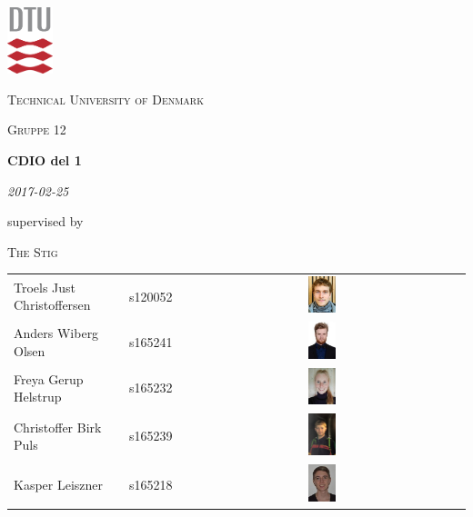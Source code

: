 \begin{titlepage}

\centering
\includegraphics[width=0.1\textwidth]{images/dtu.pdf}\par\vspace{1cm}

{\scshape\LARGE Technical University of Denmark \par}
	\vspace{1cm}
	{\scshape\Large Gruppe 12\par}
	\vspace{1.5cm}
	{\huge\bfseries CDIO del 1\par}
	\vspace{2cm}
	{\Large\itshape 2017-02-25\par}
	\vfill
	supervised by\par
	\textsc{The Stig}

	\vfill

\end{titlepage}

\centering
\begin{tabular}{l l c}
    Troels Just Christoffersen & s120052 & \includegraphics[width=0.1\textwidth]{images/troels.jpg}\\
     Anders Wiberg Olsen & s165241 & \includegraphics[width=0.1\textwidth]{images/anders.jpg}\\
     Freya Gerup Helstrup &  	s165232 & \includegraphics[width=0.1\textwidth]{images/Freya.jpg}\\
      Christoffer Birk Puls & s165239 & \includegraphics[width=0.1\textwidth]{images/Christoffer.jpg}\\
      Kasper Leiszner & s165218 & \includegraphics[width=0.1\textwidth]{images/kasper.jpg}\\
\end{tabular}
